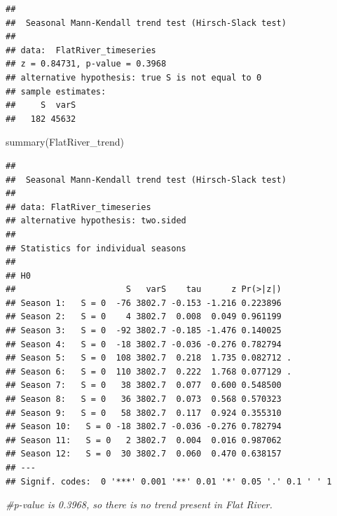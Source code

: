\documentclass[
  12pt,
]{article}
\newenvironment{Shaded}{\begin{snugshade}}{\end{snugshade}}
\newcommand{\AttributeTok}[1]{\textcolor[rgb]{0.77,0.63,0.00}{#1}}
\newcommand{\CommentTok}[1]{\textcolor[rgb]{0.56,0.35,0.01}{\textit{#1}}}
\newcommand{\DecValTok}[1]{\textcolor[rgb]{0.00,0.00,0.81}{#1}}
\newcommand{\FunctionTok}[1]{\textcolor[rgb]{0.00,0.00,0.00}{#1}}
\newcommand{\NormalTok}[1]{#1}
\newcommand{\OtherTok}[1]{\textcolor[rgb]{0.56,0.35,0.01}{#1}}
\newcommand{\SpecialCharTok}[1]{\textcolor[rgb]{0.00,0.00,0.00}{#1}}
\newcommand{\StringTok}[1]{\textcolor[rgb]{0.31,0.60,0.02}{#1}}
\begin{document}
\begin{verbatim}
## 
##  Seasonal Mann-Kendall trend test (Hirsch-Slack test)
## 
## data:  FlatRiver_timeseries
## z = 0.84731, p-value = 0.3968
## alternative hypothesis: true S is not equal to 0
## sample estimates:
##     S  varS 
##   182 45632
\end{verbatim}

\begin{Shaded}
\begin{Highlighting}[]
\FunctionTok{summary}\NormalTok{(FlatRiver\_trend)}
\end{Highlighting}
\end{Shaded}

\begin{verbatim}
## 
##  Seasonal Mann-Kendall trend test (Hirsch-Slack test)
## 
## data: FlatRiver_timeseries
## alternative hypothesis: two.sided
## 
## Statistics for individual seasons
## 
## H0
##                      S   varS    tau      z Pr(>|z|)  
## Season 1:   S = 0  -76 3802.7 -0.153 -1.216 0.223896  
## Season 2:   S = 0    4 3802.7  0.008  0.049 0.961199  
## Season 3:   S = 0  -92 3802.7 -0.185 -1.476 0.140025  
## Season 4:   S = 0  -18 3802.7 -0.036 -0.276 0.782794  
## Season 5:   S = 0  108 3802.7  0.218  1.735 0.082712 .
## Season 6:   S = 0  110 3802.7  0.222  1.768 0.077129 .
## Season 7:   S = 0   38 3802.7  0.077  0.600 0.548500  
## Season 8:   S = 0   36 3802.7  0.073  0.568 0.570323  
## Season 9:   S = 0   58 3802.7  0.117  0.924 0.355310  
## Season 10:   S = 0 -18 3802.7 -0.036 -0.276 0.782794  
## Season 11:   S = 0   2 3802.7  0.004  0.016 0.987062  
## Season 12:   S = 0  30 3802.7  0.060  0.470 0.638157  
## ---
## Signif. codes:  0 '***' 0.001 '**' 0.01 '*' 0.05 '.' 0.1 ' ' 1
\end{verbatim}

\begin{Shaded}
\begin{Highlighting}[]
\CommentTok{\#p{-}value is 0.3968, so there is no trend present in Flat River.}
\end{Highlighting}
\end{Shaded}

\begin{Shaded}
\end{Shaded}
\end{document}
